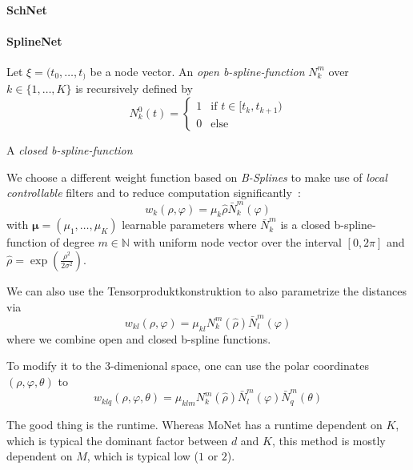 \documentclass[pdftex,10pt,a4paper]{scrartcl}
\begin{document}
\paragraph{SchNet}

\paragraph{SplineNet}

Let $\xi = (t_0, \ldots, t_)$ be a node vector.
An \emph{open b-spline-function} $N_k^m$ over $k \in \{ 1, \ldots, K \}$ is recursively defined by
\begin{equation*}
  N_k^0(t) = \begin{cases}
    1 & \text{if } t \in [t_k, t_{k+1})\\
    0 & \text{else}
  \end{cases}
\end{equation*}

A \emph{closed b-spline-function}

We choose a different weight function based on \emph{B-Splines} to make use of \emph{local controllable} filters and to reduce computation significantly~\cite{Fey2017}:
\begin{equation*}
  w_k(\rho, \varphi) = \mu_k \hat{\rho} \bar{N}_k^m(\varphi)
\end{equation*}
with $\boldsymbol{\mu} = (\mu_1, \ldots, \mu_K )$ learnable parameters where $\bar{N}_k^m$ is a closed b-spline-function of degree $m \in \mathbb{N}$ with uniform node vector over the interval $[0, 2\pi]$ and $\hat{\rho} = \exp(\frac{\rho^2}{2\sigma^2})$.

We can also use the Tensorproduktkonstruktion to also parametrize the distances via
\begin{equation*}
  w_{kl}(\rho, \varphi) = \mu_{kl} N_k^m(\hat{\rho}) \bar{N}_l^m(\varphi)
\end{equation*}
where we combine open and closed b-spline functions.

To modify it to the 3-dimenional space, one can use the polar coordinates $(\rho, \varphi, \theta)$ to
\begin{equation*}
  w_{klq}(\rho, \varphi, \theta) = \mu_{klm} N_k^m(\hat{\rho}) \bar{N}_l^m(\varphi) \bar{N}_q^m(\theta)
\end{equation*}

The good thing is the runtime.
Whereas MoNet has a runtime dependent on $K$, which is typical the dominant factor between $d$ and $K$, this method is mostly dependent on $M$, which is typical low ($1$ or $2$).
\end{document}

